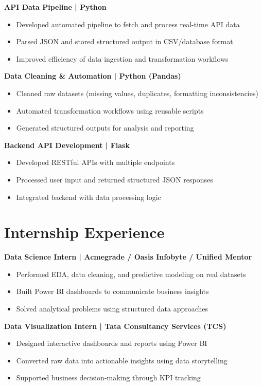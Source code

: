 \documentclass[letterpaper,11pt]{article}
\begin{document}
\textbf{API Data Pipeline | Python}
\begin{itemize}[leftmargin=*]
\item Developed automated pipeline to fetch and process real-time API data
\item Parsed JSON and stored structured output in CSV/database format
\item Improved efficiency of data ingestion and transformation workflows
\end{itemize}

\textbf{Data Cleaning \& Automation | Python (Pandas)}
\begin{itemize}[leftmargin=*]
\item Cleaned raw datasets (missing values, duplicates, formatting inconsistencies)
\item Automated transformation workflows using reusable scripts
\item Generated structured outputs for analysis and reporting
\end{itemize}

\textbf{Backend API Development | Flask}
\begin{itemize}[leftmargin=*]
\item Developed RESTful APIs with multiple endpoints
\item Processed user input and returned structured JSON responses
\item Integrated backend with data processing logic
\end{itemize}

\section*{Internship Experience}

\textbf{Data Science Intern | Acmegrade / Oasis Infobyte / Unified Mentor}
\begin{itemize}[leftmargin=*]
\item Performed EDA, data cleaning, and predictive modeling on real datasets
\item Built Power BI dashboards to communicate business insights
\item Solved analytical problems using structured data approaches
\end{itemize}

\textbf{Data Visualization Intern | Tata Consultancy Services (TCS)}
\begin{itemize}[leftmargin=*]
\item Designed interactive dashboards and reports using Power BI
\item Converted raw data into actionable insights using data storytelling
\item Supported business decision-making through KPI tracking
\end{itemize}
\end{document}
